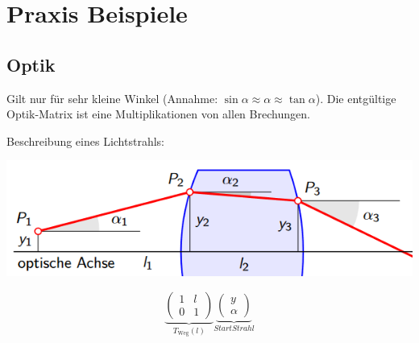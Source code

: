 \section{Praxis Beispiele}
\subsection{Optik}
Gilt nur für sehr kleine Winkel (Annahme: $\sin\alpha \approx \alpha \approx \tan\alpha$). Die entgültige Optik-Matrix ist eine Multiplikationen von allen Brechungen. \\


\begin{minipage}{\textwidth}
	\noindent Beschreibung eines Lichtstrahls:
	
	\begin{minipage}{0.25\textwidth}
		\includegraphics[width=\linewidth,keepaspectratio=true]{./Images/optik_lichstrahl.png}
	\end{minipage}%
	\begin{minipage}{0.25\textwidth}	
		\[
			\underbrace{\begin{pmatrix} 1 & l \\ 0 & 1\end{pmatrix}}_{T_{\text{Weg}}(l)}
			\underbrace{\begin{pmatrix} y \\ \alpha \end{pmatrix}}_{StartStrahl}
		\]
	\end{minipage}
\end{minipage}

